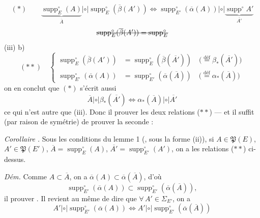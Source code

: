 \documentclass[11pt,a4paper]{article}
\begin{document}

\[
  (\ast) \qquad
  \underbrace{\operatorname{supp}^{\circ}_E(A)}_{\overline{A}} \mathrel{|\circ|} \operatorname{supp}^{\circ}_E(\overline{\beta}(A'))
  \iff
  \operatorname{supp}^{\circ}_{E'}(\overline{\alpha}(A)) \mathrel{|\circ|} \underbrace{\operatorname{supp}^{\circ} A'}_{\overline{A'}}
\]
\[
  \text{\struck{$\operatorname{supp}^{\circ}_E(\overline{\beta}(A')) = \operatorname{supp}^{\circ}_E$}}
\]
 (iii) b)  
\[
  (\ast\ast) \quad
  \left\{
  \begin{aligned}
    \operatorname{supp}^{\circ}_E(\overline{\beta}(A')) &= \operatorname{supp}^{\circ}_E(\overline{\beta}(\overline{A'})) \quad \bigl(\overset{\text{déf}}{=} \beta_{*}(\overline{A'})\bigr) \\
    \operatorname{supp}^{\circ}_{E'}(\overline{\alpha}(A)) &= \operatorname{supp}^{\circ}_{E'}(\overline{\alpha}(\overline{A})) \quad \bigl(\overset{\text{déf}}{=} \alpha_{*}(\overline{A})\bigr)
  \end{aligned}
  \right.
\]
on en conclut que $(\ast)$ s'écrit aussi
\[
  \overline{A} \mathrel{|\circ|} \beta_{*}(\overline{A'}) \iff \alpha_{*}(\overline{A}) \mathrel{|\circ|} \overline{A'}
\]
ce qui n'est autre que (iii). Donc il   prouver  les deux relations ($\ast\ast$) --- et il suffit  (par raison de symétrie) de prouver la seconde :

\emph{Corollaire .} Sous les conditions du lemme 1 (, sous la forme (ii)), si $A \in \mathfrak{P}(E)$, $A' \in \mathfrak{P}(E')$, $\overline{A} = \operatorname{supp}^{\circ}_E(A)$, $\overline{A'} = \operatorname{supp}^{\circ}_{E'}(A')$, on a les relations ($\ast\ast$) ci-dessus.

\emph{Dém.} Comme $A \subset \overline{A}$, on a $\overline{\alpha}(A) \subset \overline{\alpha}(\overline{A})$, d'où
\[
  \operatorname{supp}^{\circ}_{E'}(\overline{\alpha}(A)) \subset \operatorname{supp}^{\circ}_{E'}(\overline{\alpha}(\overline{A})) ,
\]
il  prouver \uncertain{$\supset$}. Il revient au même de dire que $\forall\, A' \in \Sigma_{E'}$, on a
\[
  A' \mathrel{|\circ|} \operatorname{supp}^{\circ}_{E'}(\overline{\alpha}(A)) \iff A' \mathrel{|\circ|} \operatorname{supp}^{\circ}_{E'}(\overline{\alpha}(\overline{A}))
\]
\end{document}
